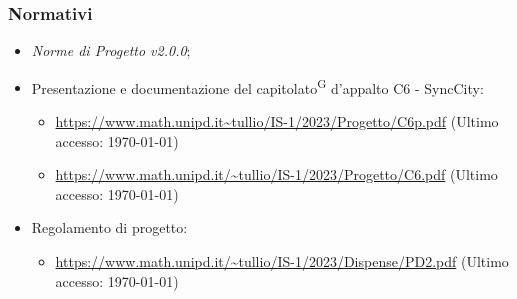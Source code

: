 \documentclass[8pt]{article}
\newcommand{\glossterm}[1]{#1\textsuperscript{G}} %
\begin{document}
\subsubsection{Normativi}
\begin{itemize}
	\item \textit{Norme di Progetto v2.0.0};
	\item Presentazione e documentazione del \glossterm{capitolato} d’appalto C6 - SyncCity:
	\begin{itemize}
		\item \href{https://www.math.unipd.it/~tullio/IS-1/2023/Progetto/C6p.pdf}{\color{myblue}https://www.math.unipd.it\textasciitilde{}tullio/IS-1/2023/Progetto/C6p.pdf} (Ultimo accesso: \today)
		\item \href{https://www.math.unipd.it/~tullio/IS-1/2023/Progetto/C6.pdf}{\color{myblue}https://www.math.unipd.it/\textasciitilde{}tullio/IS-1/2023/Progetto/C6.pdf} (Ultimo accesso: \today)
	\end{itemize}
	\item Regolamento di progetto:
	\begin{itemize}
		\item \href{https://www.math.unipd.it/~tullio/IS-1/2023/Dispense/PD2.pdf}{\color{myblue}https://www.math.unipd.it/\textasciitilde{}tullio/IS-1/2023/Dispense/PD2.pdf} (Ultimo accesso: \today)
	\end{itemize}
\end{itemize}
\clearpage
\end{document}

